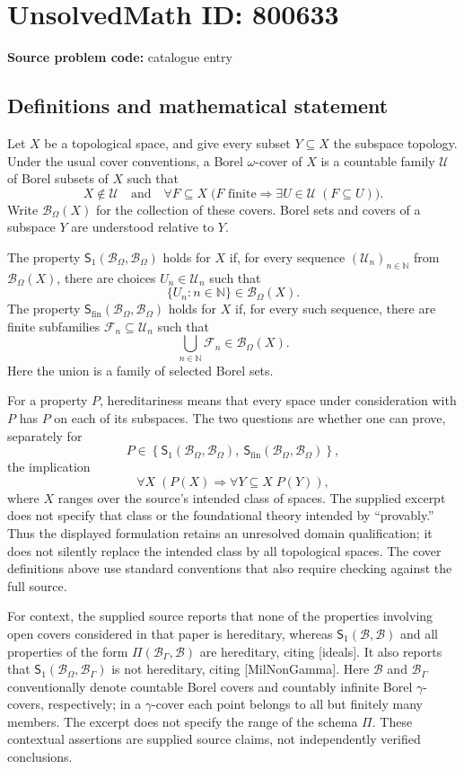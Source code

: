 \documentclass[11pt]{article}
\newcommand{\N}{\mathbb{N}}
\begin{document}
\section*{UnsolvedMath ID: 800633}
\textbf{Source problem code:} catalogue entry
\subsection{Definitions and mathematical statement}
Let \(X\) be a topological space, and give every subset \(Y\subseteq X\) the subspace topology. Under the usual cover conventions, a Borel \(\omega\)-cover of \(X\) is a countable family \(\mathcal U\) of Borel subsets of \(X\) such that
\[
X\notin\mathcal U
\quad\text{and}\quad
\forall F\subseteq X\;\bigl(F\text{ finite}\Longrightarrow\exists U\in\mathcal U\;(F\subseteq U)\bigr).
\]
Write \(\mathcal B_\Omega(X)\) for the collection of these covers. Borel sets and covers of a subspace \(Y\) are understood relative to \(Y\).

The property \(\mathsf S_1(\mathcal B_\Omega,\mathcal B_\Omega)\) holds for \(X\) if, for every sequence \((\mathcal U_n)_{n\in\N}\) from \(\mathcal B_\Omega(X)\), there are choices \(U_n\in\mathcal U_n\) such that
\[
\{U_n:n\in\N\}\in\mathcal B_\Omega(X).
\]
The property \(\mathsf S_{\mathrm{fin}}(\mathcal B_\Omega,\mathcal B_\Omega)\) holds for \(X\) if, for every such sequence, there are finite subfamilies \(\mathcal F_n\subseteq\mathcal U_n\) such that
\[
\bigcup_{n\in\N}\mathcal F_n\in\mathcal B_\Omega(X).
\]
Here the union is a family of selected Borel sets.

For a property \(P\), hereditariness means that every space under consideration with \(P\) has \(P\) on each of its subspaces. The two questions are whether one can prove, separately for
\[
P\in\left\{\mathsf S_1(\mathcal B_\Omega,\mathcal B_\Omega),\ \mathsf S_{\mathrm{fin}}(\mathcal B_\Omega,\mathcal B_\Omega)\right\},
\]
the implication
\[
\forall X\;\left(P(X)\Longrightarrow\forall Y\subseteq X\;P(Y)\right),
\]
where \(X\) ranges over the source's intended class of spaces. The supplied excerpt does not specify that class or the foundational theory intended by ``provably.'' Thus the displayed formulation retains an unresolved domain qualification; it does not silently replace the intended class by all topological spaces. The cover definitions above use standard conventions that also require checking against the full source.

For context, the supplied source reports that none of the properties involving open covers considered in that paper is hereditary, whereas \(\mathsf S_1(\mathcal B,\mathcal B)\) and all properties of the form \(\Pi(\mathcal B_\Gamma,\mathcal B)\) are hereditary, citing [ideals]. It also reports that \(\mathsf S_1(\mathcal B_\Omega,\mathcal B_\Gamma)\) is not hereditary, citing [MilNonGamma]. Here \(\mathcal B\) and \(\mathcal B_\Gamma\) conventionally denote countable Borel covers and countably infinite Borel \(\gamma\)-covers, respectively; in a \(\gamma\)-cover each point belongs to all but finitely many members. The excerpt does not specify the range of the schema \(\Pi\). These contextual assertions are supplied source claims, not independently verified conclusions.
\end{document}
